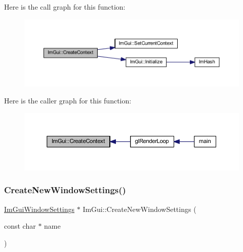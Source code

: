 Here is the call graph for this function\+:
\nopagebreak
\begin{figure}[H]
\begin{center}
\leavevmode
\includegraphics[width=350pt]{namespace_im_gui_a4ff6c9ad05a0eba37ce1b5ff1607810a_cgraph}
\end{center}
\end{figure}
Here is the caller graph for this function\+:
\nopagebreak
\begin{figure}[H]
\begin{center}
\leavevmode
\includegraphics[width=350pt]{namespace_im_gui_a4ff6c9ad05a0eba37ce1b5ff1607810a_icgraph}
\end{center}
\end{figure}
\mbox{\label{namespace_im_gui_a2f325a08e833855b408f70a96d5fa064}} 
\subsubsection{\texorpdfstring{Create\+New\+Window\+Settings()}{CreateNewWindowSettings()}}
{\footnotesize\ttfamily \mbox{\hyperlink{struct_im_gui_window_settings}{Im\+Gui\+Window\+Settings}} $\ast$ Im\+Gui\+::\+Create\+New\+Window\+Settings (\begin{DoxyParamCaption}\item[{const char $\ast$}]{name }\end{DoxyParamCaption})}

